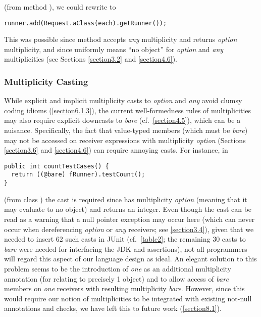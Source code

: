 {\noindent (from method ), we could rewrite
to

\begin{lstlisting}
runner.add(Request.aClass(each).getRunner());
\end{lstlisting}

\noindent This was possible since method  accepts
\emph{any} multiplicity and  returns
\emph{option} multiplicity, and since  uniformly means
``no object'' for \emph{option} and \emph{any} multiplicities
(see Sections \ref{section3.2} and \ref{section4.6}).

\subsubsection{Multiplicity Casting}
\label{section6.2.2}

\noindent While explicit and implicit multiplicity casts to
\emph{option} and \emph{any} avoid clumsy coding idioms
(\autoref{section6.1.3}), the current well-formedness rules of multiplicities may also require
explicit downcasts to \emph{bare} (cf.~\autoref{section4.5}), which can be a
nuisance. Specifically, the fact that value-typed members (which must be
\emph{bare}) may not be accessed on receiver expressions with
multiplicity \emph{option} (Sections \ref{section3.6} and \ref{section4.6}) can require annoying
casts. For instance, in

\begin{lstlisting}
public int countTestCases() {
  return ((@bare) fRunner).testCount();
}
\end{lstlisting}

\noindent (from class ) the cast  is
required since  has multiplicity \emph{option} (meaning that
it may evaluate to no object) and  returns an integer.
Even though the cast  can be read as a warning that a null
pointer exception may occur here (which can never occur when dereferencing
\emph{option} or \emph{any} receivers; see \autoref{section3.4}), given
that we needed to insert 62 such casts in JUnit (cf.~\autoref{table2}; the remaining
30 casts to \emph{bare} were needed for interfacing the JDK and
assertions), not all programmers will regard this aspect of our language
design as ideal. An elegant solution to this problem seems to be the
introduction of \emph{one} as an additional multiplicity annotation
(for relating to precisely 1 object) and to allow access of \emph{bare}
members on \emph{one} receivers with resulting multiplicity
\emph{bare}. However, since this would require our notion of
multiplicities to be integrated with existing not-null annotations and
checks, we have left this to future work (\autoref{section8.1}).

}
